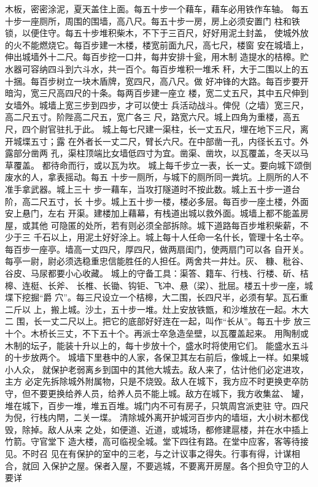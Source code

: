 \documentclass[12pt,UTF8]{ctexbook}
\begin{document}
木板，密密涂泥，夏天盖住上面。每五十步一个藉车，藉车必用铁作车轴。 
每五十步一座厕所，周围的围墙，高八尺。每五十步一房，房上必须安置门 
柱和铁锁，以便住守。每五十步堆积柴木，不下于三百尺，好好用泥土封盖， 
使城外放的火不能燃烧它。每百步建一木楼，楼宽前面九尺，高七尺，楼窗 
安在城墙上，伸出城墙外十二尺。每百步挖一口井，每井安排十瓮，用木制 
造提水的桔槔。贮水器可容纳四斗到六斗水，共一百个。每百步堆积一堆禾 
秆，大于二围以上的五十捆。每百步树立一块木盾牌，宽四尺，高八尺。做 
好冲锋的大路。每百步要开暗沟，宽三尺高四尺的十条。每两百步建一座立 
楼，宽二丈五尺，其中五尺伸到女墙外。城墙上宽三步到四步，才可以使士 
兵活动战斗。俾倪（之墙）宽三尺，高二尺五寸。阶陛高二尺五，宽广各三 
尺，路宽六尺。城上四角为重楼，高五尺，四个尉官驻扎于此。 
城上每七尺建一渠柱，长一丈五尺，埋在地下三尺，离开城堞五寸；露 
在外者长一丈二尺，臂长六尺。在中部凿一孔，内径长五寸。外露部分凿两 
孔，渠柱顶端比女墙低四寸为宜。凿渠、凿坎，以瓦覆盖，冬天以马草覆盖。 
都待命而行，或以瓦为坎。 
城上每千步立一表，长一丈。要向城下颂倒废水的人，拿表摇动。每五 
十步一厕所，与城下的厕所同一粪坑。上厕所的人不准手拿武器。城上三十 
步一藉车，当攻打隧道时不按此数。城上五十步一道台阶，高二尺五寸，长 
十步。城上五十步一楼，楼必多层。每百步一座土楼，外面安上悬门，左右 
开渠。建楼加上藉幕，有栈道出城以救外面。城墙上都不能盖房屋，或其他 
可隐匿的处所，若有则必须全部拆除。城下道路每百步堆积柴薪，不少于三 
千石以上，用泥土好好涂上。城上每十人任命一名什长，管理十名士卒。 
每百步一座亭。墙高一丈四尺，厚四尺，做两扇闺门，使两扇门可以各 
自开关。每亭一尉，尉必须选稳重忠信能胜任的人担任。两舍共一井灶。灰、 
糠、秕谷、谷皮、马尿都要小心收藏。 
城上的守备工具：渠答、籍车、行栈、行楼、斫、桔槔、连梃、长斧、 
长椎、长锄、钩钜、飞冲、悬（梁）、批屈。楼五十步一座，城堞下挖掘“爵 
穴”。每三尺设立一个桔槔，大二围，长四尺半，必须有挈。瓦石重二斤以 
上，搬上城。沙土，五十步一堆。灶上安放铁甑，和沙堆放在一起。木大二 
围，长一丈二尺以上。把它的底部好好连在一起，叫作“长从”。每五十步 
放三十个。木桥长三丈，不下五十个。再派士卒急造垒壁，以瓦覆盖起来。 
用陶制或木制的坛子，能装十升以上的，每十步放十个，盛水时将使用它们。 
能盛水五斗的十步放两个。 
城墙下里巷中的人家，各保卫其左右前后，像城上一样。如果城小人众， 
就保护老弱离乡到国中的其他大城去。敌人来了，估计他们必定进攻，主方 
必定先拆除城外附属物，只是不烧毁。敌人在城下，我方应不时更换吏卒防 
守，但不要更换给养人员，给养人员不能上城。敌方在城下，我方收集盆、 
罐，堆在城下，百步一堆，堆五百堆。城门内不可有房子，只筑周宫派吏驻 
守。四尺为倪，行栈内閈，二关一堞。 
清除城外离开护城河百步内的墙垣，大小树木都伐毁，除掉。敌人从来 
之处，如便道、近道，或城场，都修建扈楼，并在水中插上竹箭。守官堂下 
造大楼，高可临视全城。堂下四往有路。在堂中应客，客等待接见。不时召 
见在有保护的室中的三老，与之计议事之得失。行事有得，计谋相合，就回 
入保护之屋。保者入屋，不要逃城，不要离开房屋。各个担负守卫的人要详 
\end{document}

